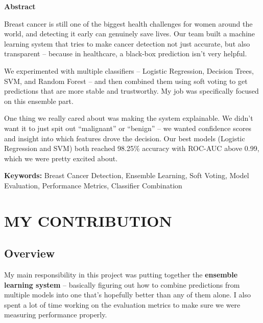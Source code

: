 \documentclass[12pt]{article}
\begin{document}
\newpage
{}
\begin{center}
    \textbf{\Large Abstract}
\end{center}

\noindent Breast cancer is still one of the biggest health challenges for women around the world, and detecting it early can genuinely save lives. Our team built a machine learning system that tries to make cancer detection not just accurate, but also transparent -- because in healthcare, a black-box prediction isn't very helpful.

\vspace{0.5cm}
\noindent We experimented with multiple classifiers -- Logistic Regression, Decision Trees, SVM, and Random Forest -- and then combined them using soft voting to get predictions that are more stable and trustworthy. My job was specifically focused on this ensemble part.

\vspace{0.5cm}
\noindent One thing we really cared about was making the system explainable. We didn't want it to just spit out ``malignant'' or ``benign'' -- we wanted confidence scores and insight into which features drove the decision. Our best models (Logistic Regression and SVM) both reached 98.25\% accuracy with ROC-AUC above 0.99, which we were pretty excited about.

\vspace{0.5cm}
\noindent \textbf{Keywords:} Breast Cancer Detection, Ensemble Learning, Soft Voting, Model Evaluation, Performance Metrics, Classifier Combination

\newpage
\tableofcontents

\newpage
{}
\section{MY CONTRIBUTION}

\subsection{Overview}
My main responsibility in this project was putting together the \textbf{ensemble learning system} -- basically figuring out how to combine predictions from multiple models into one that's hopefully better than any of them alone. I also spent a lot of time working on the evaluation metrics to make sure we were measuring performance properly.
\end{document}
